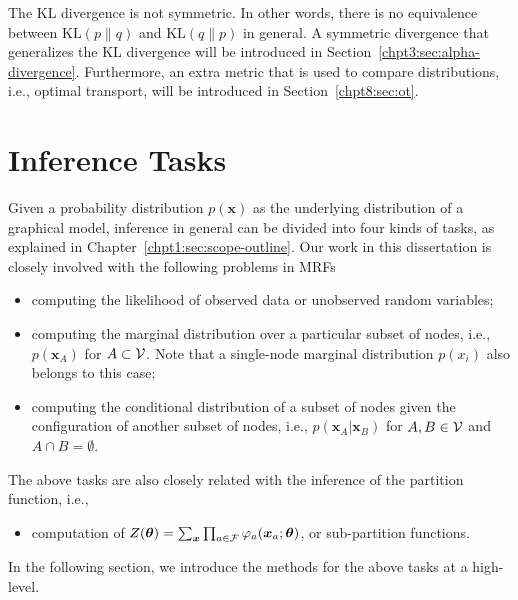 The KL divergence is not symmetric. In other words, there is no equivalence between $\mathrm{KL}(p\|q)$ and $\mathrm{KL}(q\|p)$ in general. A symmetric divergence that generalizes the KL divergence will be introduced in Section~\ref{chpt3:sec:alpha-divergence}. Furthermore, an extra metric that is used to compare distributions, i.e., optimal transport, will be introduced in Section~\ref{chpt8:sec:ot}.



\section{Inference Tasks}


Given a probability distribution $p(\bm{x})$ as the underlying distribution of a graphical model, inference in general can be divided into four kinds of tasks, as explained in Chapter~\ref{chpt1:sec:scope-outline}. Our work in this dissertation is closely involved with the following problems in MRFs
\begin{itemize}
\item computing the likelihood of observed data or unobserved random variables;
\item computing the marginal distribution over a particular subset of nodes, i.e., $p(\bm{x}_A)$ for $A \subset \mathcal{V}$. Note that a single-node marginal distribution $p(x_i)$ also belongs to this case;
\item computing the conditional distribution of a subset of nodes given the configuration of another subset of nodes, i.e., $p(\bm{x}_A| \bm{x}_B)$ for $A, B \in \mathcal{V}$ and $A \cap B = \emptyset$.
\end{itemize}
The above tasks are also closely related with the inference of the partition function, i.e.,
\begin{itemize}
\item computation of $Z(\bm{\theta}) = \sum_{\bm{x}} \prod_{a \in \mathcal{F}} \varphi_{a}(\bm{x}_{a};\bm{\theta})$, or sub-partition functions.
\end{itemize}

In the following section, we introduce the methods for the above tasks at a high-level.

